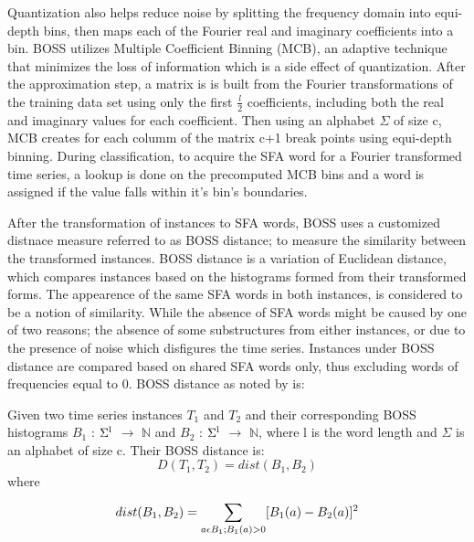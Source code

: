 Quantization also helps reduce noise by splitting the frequency domain into equi-depth bins, then maps each of the Fourier real and imaginary coefficients into a bin.
BOSS utilizes Multiple Coefficient Binning (MCB), an adaptive technique that minimizes the loss of information which is a side effect of quantization.
After the approximation step, a matrix is is built from the Fourier transformations of the training data set using only the first $\frac{l}{2}$ coefficients,
including both the real and imaginary values for each coefficient. Then using an alphabet $\Sigma$ of size c, MCB creates for each columm of the matrix c+1 break points
using equi-depth binning. During classification, to acquire the SFA word for a Fourier transformed time series, a lookup is done on the precomputed MCB bins and
a word is assigned if the value falls within it's bin's boundaries.

After the transformation of instances to SFA words, BOSS uses a customized distnace measure referred to as BOSS distance; to measure the similarity between the transformed instances.
BOSS distance is a variation of Euclidean distance, which compares instances based on the histograms formed from their transformed forms. The appearence of the same SFA words in both
instances, is considered to be a notion of similarity. While the absence of SFA words might be caused by one of two reasons; the absence of some substructures from either instances,
or due to the presence of noise which disfigures the time series. Instances under BOSS distance are compared based on shared SFA words only, thus excluding words of frequencies equal to 0.
BOSS distance as noted by \cite{schafer2015boss} is:

Given two time series instances $T_{1}$ and $T_{2}$ and their corresponding
BOSS histograms $B_{1}$ : $\Sigma\textsuperscript{l}$ $\to$ $\mathbb{N}$
and $B_{2}$ : $\Sigma\textsuperscript{l}$ $\to$ $\mathbb{N}$, where l is the word length and $\Sigma$ is an alphabet of size c. Their BOSS distance is:
\begin{equation}
        D(T_{1},T_{2}) = dist(B_{1},B_{2})
\end{equation}
where
\begin{equation}
    dist(B_{1},B_{2}) = \sum_{a \epsilon B_{1};B_{1}(a)>0}^{} [B_{1}(a) - B_{2}(a)]\textsuperscript{2}
\end{equation}


